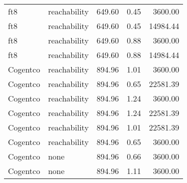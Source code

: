 \begin{tabular}{llrrr}
ft8 & reachability & 649.60 & 0.45 & 3600.00 \\
ft8 & reachability & 649.60 & 0.45 & 14984.44 \\
ft8 & reachability & 649.60 & 0.88 & 3600.00 \\
ft8 & reachability & 649.60 & 0.88 & 14984.44 \\
Cogentco & reachability & 894.96 & 1.01 & 3600.00 \\
Cogentco & reachability & 894.96 & 0.65 & 22581.39 \\
Cogentco & reachability & 894.96 & 1.24 & 3600.00 \\
Cogentco & reachability & 894.96 & 1.24 & 22581.39 \\
Cogentco & reachability & 894.96 & 1.01 & 22581.39 \\
Cogentco & reachability & 894.96 & 0.65 & 3600.00 \\
Cogentco & none & 894.96 & 0.66 & 3600.00 \\
Cogentco & none & 894.96 & 1.11 & 3600.00 \\
\bottomrule
\end{tabular}
